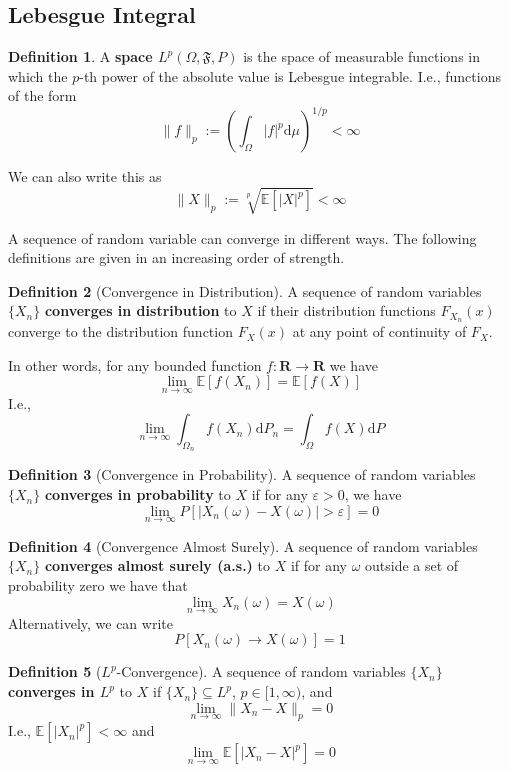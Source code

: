 \documentclass[12pt,a4paper]{article}
\theoremstyle{definition}
\newtheorem{definition}{Definition}[section]
\begin{document}
\subsection{Lebesgue Integral}


\begin{definition}
	A \textbf{space $L^p (\Omega, \mathfrak{F}, P)$} is the space of measurable functions in which the $p$-th power of the absolute value is Lebesgue integrable. I.e., functions of the form
	\[
		\| f \|_p := \left( \int_\Omega |f|^p \mathrm{d}\mu \right)^{1/p} < \infty
	\]

	We can also write this as
	\[
		\| X \|_p := \sqrt[p]{\mathbb{E}[|X|^p]} < \infty
	\]
\end{definition}

A sequence of random variable can converge in different ways. The following definitions are given in an increasing order of strength.

\begin{definition}[Convergence in Distribution]
	A sequence of random variables $\{ X_n \}$ \textbf{converges in distribution} to $X$ if their distribution functions $F_{X_n}(x)$ converge to the distribution function $F_X(x)$ at any point of continuity of $F_X$.
	
	In other words, for any bounded function $f : \textbf{R} \longrightarrow \textbf{R}$ we have
	\[
		\lim_{n \to \infty} \mathbb{E}[f(X_n)] = \mathbb{E}[f(X)]
	\]
	I.e.,
	\[
		\lim_{n \to \infty} \int_{\Omega_n} f(X_n) \mathrm{d}P_n = \int_{\Omega} f(X) \mathrm{d}P
	\]
\end{definition}

\begin{definition}[Convergence in Probability]
	A sequence of random variables $\{ X_n \}$ \textbf{converges in probability} to $X$ if for any $\varepsilon > 0$, we have
	\[
		\lim_{n \to \infty} P[|X_n(\omega) - X(\omega)| > \varepsilon] = 0
	\]
\end{definition}

\begin{definition}[Convergence Almost Surely]
	A sequence of random variables $\{ X_n \}$ \textbf{converges almost surely (a.s.)} to $X$ if for any $\omega$ outside a set of probability zero we have that
	\[
		\lim_{n \to \infty} X_n(\omega) = X(\omega)
	\]
	Alternatively, we can write
	\[
		P[X_n(\omega) \to X(\omega)] = 1
	\]
\end{definition}

\begin{definition}[$L^p$-Convergence]
	A sequence of random variables $\{ X_n \}$ \textbf{converges in $L^p$} to $X$ if $\{X_n\} \subseteq L^p$, $p \in [1,\infty)$, and
	\[
		\lim_{n \to \infty} \|X_n - X\|_p = 0
	\]
	I.e., $\mathbb{E} \left[ |X_n|^p \right] < \infty$ and
	\[
		\lim_{n \to \infty} \mathbb{E} \left[ |X_n - X|^p \right] = 0
	\]
\end{definition}
\end{document}
